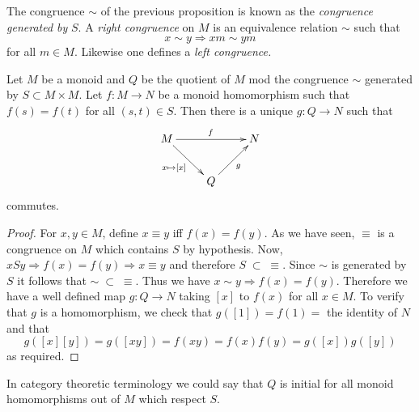 \begin{defns} The congruence $\sim$ of the previous proposition is known as the
    \emph{congruence generated by} $S$. A \emph{right congruence} on $M$ is an
    equivalence relation $\sim$ such that \[x\sim y \Rightarrow xm \sim ym\]
    for all $m\in M$. Likewise one defines a \emph{left congruence.}
\end{defns}

\begin{prop} \label{ExtCong} Let $M$ be a monoid and $Q$ be the quotient of $M$
    mod the congruence $\sim$ generated by $S \subset M\times M$. Let $f: M
    \rightarrow N$ be a monoid homomorphism such that $f(s) = f(t)$ for all
    $(s,t)\in S$. Then there is a unique $g: Q \rightarrow N$ such that
    \[\xymatrix{ M \ar[rr]^f \ar[dr]_{x\mapsto [x]}& & N\\ & Q\ar[ur]_g } \]
    commutes.
\end{prop}
\begin{proof} For $x,y\in M$, define $x \equiv y$ iff $f(x) = f(y)$. As we have
    seen, $\equiv$ is a congruence on $M$ which contains $S$ by hypothesis.
    Now, $xSy \Rightarrow f(x) = f(y) \Rightarrow x \equiv y$ and therefore $S
    \; \subset\;  \equiv$. Since $\sim$ is generated by $S$ it follows that
    $\sim\;  \subset\;  \equiv$. Thus we have $x\sim y \Rightarrow f(x) =
    f(y)$. Therefore we have a well defined map $g : Q \rightarrow N$ taking
    $[x]$ to $f(x)$ for all $x\in M$. To verify that $g$ is a homomorphism, we
    check that $g([1]) = f(1) = $ the identity of $N$ and that \[g([x][y]) =
    g([xy]) = f(xy) = f(x)f(y) = g([x])g([y])\] as required.
\end{proof}

\begin{rem} In category theoretic terminology we could say that $Q$ is initial
    for all monoid homomorphisms out of $M$ which respect $S$.
\end{rem}

